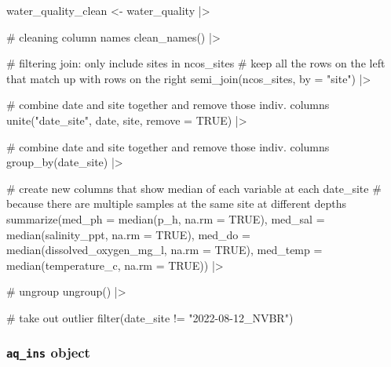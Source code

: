 \documentclass[
  letterpaper,
  DIV=11,
  numbers=noendperiod]{scrartcl}
\newenvironment{Shaded}{\begin{snugshade}}{\end{snugshade}}
\newcommand{\AttributeTok}[1]{\textcolor[rgb]{0.40,0.45,0.13}{#1}}
\newcommand{\CommentTok}[1]{\textcolor[rgb]{0.37,0.37,0.37}{#1}}
\newcommand{\ConstantTok}[1]{\textcolor[rgb]{0.56,0.35,0.01}{#1}}
\newcommand{\FunctionTok}[1]{\textcolor[rgb]{0.28,0.35,0.67}{#1}}
\newcommand{\NormalTok}[1]{\textcolor[rgb]{0.00,0.23,0.31}{#1}}
\newcommand{\OtherTok}[1]{\textcolor[rgb]{0.00,0.23,0.31}{#1}}
\newcommand{\SpecialCharTok}[1]{\textcolor[rgb]{0.37,0.37,0.37}{#1}}
\newcommand{\StringTok}[1]{\textcolor[rgb]{0.13,0.47,0.30}{#1}}
\begin{document}
\begin{Shaded}
\begin{Highlighting}[]
\NormalTok{water\_quality\_clean }\OtherTok{\textless{}{-}}\NormalTok{ water\_quality }\SpecialCharTok{|\textgreater{}} 
  
  \CommentTok{\# cleaning column names}
  \FunctionTok{clean\_names}\NormalTok{() }\SpecialCharTok{|\textgreater{}} 
  
   \CommentTok{\# filtering join: only include sites in ncos\_sites}
  \CommentTok{\# keep all the rows on the left that match up with rows on the right}
  \FunctionTok{semi\_join}\NormalTok{(ncos\_sites, }\AttributeTok{by =} \StringTok{"site"}\NormalTok{) }\SpecialCharTok{|\textgreater{}} 
  
  \CommentTok{\# combine date and site together and remove those indiv. columns}
  \FunctionTok{unite}\NormalTok{(}\StringTok{"date\_site"}\NormalTok{, date, site, }\AttributeTok{remove =} \ConstantTok{TRUE}\NormalTok{) }\SpecialCharTok{|\textgreater{}} 
  
  \CommentTok{\# combine date and site together and remove those indiv. columns}
  \FunctionTok{group\_by}\NormalTok{(date\_site) }\SpecialCharTok{|\textgreater{}} 
  
  \CommentTok{\# create new columns that show median of each variable at each date\_site}
  \CommentTok{\# because there are multiple samples at the same site at different depths}
  \FunctionTok{summarize}\NormalTok{(}\AttributeTok{med\_ph    =} \FunctionTok{median}\NormalTok{(p\_h, }\AttributeTok{na.rm =} \ConstantTok{TRUE}\NormalTok{),}
            \AttributeTok{med\_sal   =} \FunctionTok{median}\NormalTok{(salinity\_ppt, }\AttributeTok{na.rm =} \ConstantTok{TRUE}\NormalTok{),}
            \AttributeTok{med\_do    =} \FunctionTok{median}\NormalTok{(dissolved\_oxygen\_mg\_l, }\AttributeTok{na.rm =} \ConstantTok{TRUE}\NormalTok{),}
            \AttributeTok{med\_temp  =} \FunctionTok{median}\NormalTok{(temperature\_c, }\AttributeTok{na.rm =} \ConstantTok{TRUE}\NormalTok{)) }\SpecialCharTok{|\textgreater{}}
  
  \CommentTok{\# ungroup}
  \FunctionTok{ungroup}\NormalTok{() }\SpecialCharTok{|\textgreater{}} 
  
  \CommentTok{\# take out outlier}
  \FunctionTok{filter}\NormalTok{(date\_site }\SpecialCharTok{!=} \StringTok{"2022{-}08{-}12\_NVBR"}\NormalTok{)}
\end{Highlighting}
\end{Shaded}

\subsubsection{\texorpdfstring{\texttt{aq\_ins}
object}{aq\_ins object}}\label{aq_ins-object}
\end{document}
